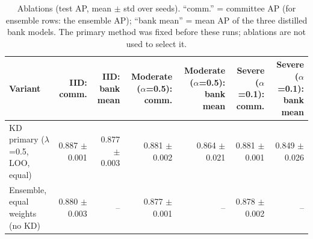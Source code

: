 \begin{table}[t]
\centering
\scriptsize
\caption{Ablations (test AP, mean $\pm$ std over seeds). ``comm.'' = committee AP (for ensemble rows: the ensemble AP); ``bank mean'' = mean AP of the three distilled bank models. The primary method was fixed before these runs; ablations are not used to select it.}
\label{tab:ablations}
\begin{tabular}{lrrrrrr}
\toprule
Variant & IID: comm. & IID: bank mean & Moderate ($\alpha$=0.5): comm. & Moderate ($\alpha$=0.5): bank mean & Severe ($\alpha$=0.1): comm. & Severe ($\alpha$=0.1): bank mean \\
\midrule
KD primary ($\lambda$=0.5, LOO, equal) & 0.887 $\pm$ 0.001 & 0.877 $\pm$ 0.003 & 0.881 $\pm$ 0.002 & 0.864 $\pm$ 0.021 & 0.881 $\pm$ 0.001 & 0.849 $\pm$ 0.026 \\
Ensemble, equal weights (no KD) & 0.880 $\pm$ 0.003 & -- & 0.877 $\pm$ 0.001 & -- & 0.878 $\pm$ 0.002 & -- \\
\bottomrule
\end{tabular}
\end{table}
